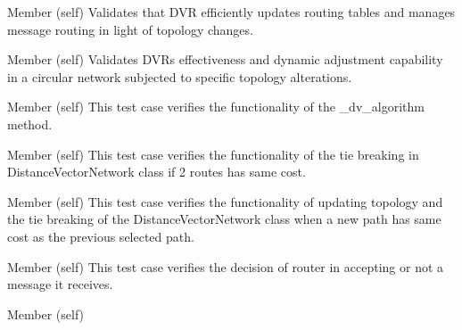 \begin{DoxyRefList}
\item[Member \doxylink{classtest__dvr_1_1_test_distance_vector_network_aff94ad2a0c8135d1d5d55f9ca445a22d}{test\+\_\+dvr.Test\+Distance\+Vector\+Network.test\+\_\+dv\+\_\+algorithm\+\_\+single\+\_\+router} (self)]\label{test__test000009}%
%
Validates that DVR efficiently updates routing tables and manages message routing in light of topology changes.  
\item[Member \doxylink{classtest__dvr_1_1_test_distance_vector_network_abcaf4ef9e267f1a1802e9f91ec241ba1}{test\+\_\+dvr.Test\+Distance\+Vector\+Network.test\+\_\+dvr\+\_\+circular} (self)]\label{test__test000010}%
%
Validates DVR\textquotesingle{}s effectiveness and dynamic adjustment capability in a circular network subjected to specific topology alterations.  
\item[Member \doxylink{classtest__dvr_1_1_test_distance_vector_network_a3e2974e7d52c679892f36bbecb145198}{test\+\_\+dvr.Test\+Distance\+Vector\+Network.test\+\_\+initialize\+\_\+dv\+\_\+network} (self)]\label{test__test000004}%
%
This test case verifies the functionality of the \+\_\+dv\+\_\+algorithm method.  
\item[Member \doxylink{classtest__dvr_1_1_test_distance_vector_network_a52a2a293b1f425a7e33ac7174bfef9d9}{test\+\_\+dvr.Test\+Distance\+Vector\+Network.test\+\_\+tie\+\_\+break} (self)]\label{test__test000005}%
%
This test case verifies the functionality of the tie breaking in Distance\+Vector\+Network class if 2 routes has same cost.  
\item[Member \doxylink{classtest__dvr_1_1_test_distance_vector_network_a90fe4d64c95d2944792f0965d77ea02b}{test\+\_\+dvr.Test\+Distance\+Vector\+Network.test\+\_\+tie\+\_\+break\+\_\+after\+\_\+change} (self)]\label{test__test000006}%
%
This test case verifies the functionality of updating topology and the tie breaking of the Distance\+Vector\+Network class when a new path has same cost as the previous selected path.  
\item[Member \doxylink{classtest__dvr_1_1_test_distance_vector_router_af0bbb563504d7504bf9af54594f4571a}{test\+\_\+dvr.Test\+Distance\+Vector\+Router.test\+\_\+should\+\_\+accept\+\_\+message} (self)]\label{test__test000002}%
%
This test case verifies the decision of router in accepting or not a message it receives.  
\item[Member \doxylink{classtest__dvr_1_1_test_distance_vector_router_ad7af008506b99eedc9997308222921b8}{test\+\_\+dvr.Test\+Distance\+Vector\+Router.test\+\_\+update\+\_\+routing\+\_\+table} (self)]\label{test__test000001}%

\end{DoxyRefList}
